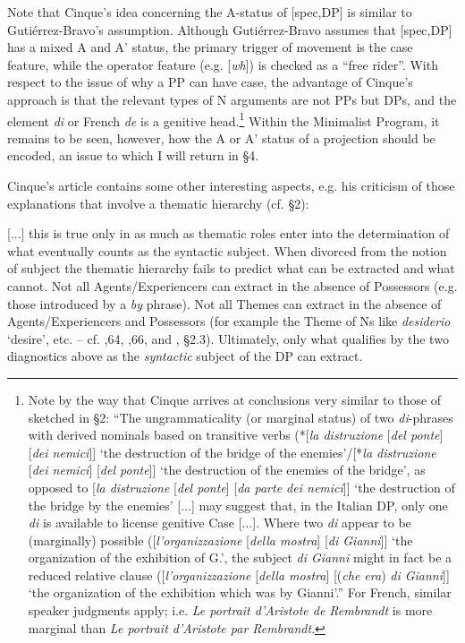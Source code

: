 \documentclass[output=paper]{langsci/langscibook}
\begin{document}
Note that Cinque’s idea concerning the A-status of [spec,DP] is similar to Gutiérrez-Bravo’s assumption. Although Gutiérrez-Bravo assumes that [spec,DP] has a mixed A and A’ status, the primary trigger of movement is the case feature, while the operator feature (e.g. [\textit{wh}]) is checked as a “free rider”. With respect to the issue of why a PP can have case, the advantage of Cinque’s approach is that the relevant types of N arguments are not PPs but DPs, and the element \textit{di} or French \textit{de} is a genitive head.\footnote{Note by the way that Cinque arrives at conclusions very similar to those of \citet{Kolliakou1999} sketched in §2: “The ungrammaticality (or marginal status) of two \textit{di}{}-phrases with derived nominals based on transitive verbs (*[\textit{la distruzione} [\textit{del ponte}] [\textit{dei nemici}]] ‘the destruction of the bridge of the enemies’/[*\textit{la distruzione} [\textit{dei nemici}] [\textit{del ponte}]] ‘the destruction of the enemies of the bridge’, as opposed to [\textit{la distruzione} [\textit{del ponte}] [\textit{da parte dei nemici}]] ‘the destruction of the bridge by the enemies’ [...] may suggest that, in the Italian DP, only one \textit{di} is available to license genitive Case [...]. Where two \textit{di} appear to be (marginally) possible ([\textit{l’organizzazione} [\textit{della mostra}] [\textit{di Gianni}]] ‘the organization of the exhibition of G.’, the subject \textit{di Gianni} might in fact be a reduced relative clause ([\textit{l’organizzazione} [\textit{della mostra}] [(\textit{che era}) \textit{di Gianni}]] ‘the organization of the exhibition which was by Gianni’.” For French, similar speaker judgments apply; i.e. \textit{Le portrait d’Aristote de Rembrandt} is more marginal than \textit{Le portrait d’Aristote par Rembrandt}.} Within the Minimalist Program, it remains to be seen, however, how the A or A’ status of a projection should be encoded, an issue to which I will return in §4.

  Cinque’s article contains some other interesting aspects, e.g. his criticism of those explanations that involve a thematic hierarchy (cf. §2):

[...] this is true only in as much as thematic roles enter into the determination of what eventually counts as the syntactic subject. When divorced from the notion of subject the thematic hierarchy fails to predict what can be extracted and what cannot. Not all Agents/Experiencers can extract in the absence of Possessors (e.g. those introduced by a \textit{by} phrase). Not all Themes can extract in the absence of Agents/Experiencers and Possessors (for example the Theme of Ns like \textit{desiderio} ‘desire’, etc. – cf. \citealt{Cinque1980},64, \citealt{Longobardi1991},66, and \citealt{Kolliakou1999}, §2.3). Ultimately, only what qualifies by the two diagnostics above as the \textit{syntactic} subject of the DP can extract.
\end{document}
